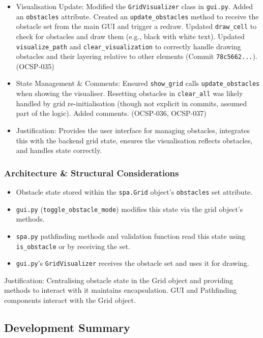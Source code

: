 \begin{enumerate}
\begin{itemize}
        \item Visualisation Update: Modified the \verb|GridVisualizer| class in \verb|gui.py|. Added an \verb|obstacles| attribute. Created an \verb|update_obstacles| method to receive the obstacle set from the main GUI and trigger a redraw. Updated \verb|draw_cell| to check for obstacles and draw them (e.g., black with white text). Updated \verb|visualize_path| and \verb|clear_visualization| to correctly handle drawing obstacles and their layering relative to other elements (Commit \verb|78c5662...|). (OCSP-035)
        \item State Management & Comments: Ensured \verb|show_grid| calls \verb|update_obstacles| when showing the visualiser. Resetting obstacles in \verb|clear_all| was likely handled by grid re-initialisation (though not explicit in commits, assumed part of the logic). Added comments. (OCSP-036, OCSP-037)
        \item Justification: Provides the user interface for managing obstacles, integrates this with the backend grid state, ensures the visualisation reflects obstacles, and handles state correctly.
    \end{itemize}
\end{enumerate}

\subsubsection{Architecture \& Structural Considerations}
\begin{itemize}
	\item Obstacle state stored within the \verb|spa.Grid| object's \verb|obstacles| set attribute.
	\item \verb|gui.py| (\verb|toggle_obstacle_mode|) modifies this state via the grid object's methods.
	\item \verb|spa.py| pathfinding methods and validation function read this state using \verb|is_obstacle| or by receiving the set.
	\item \verb|gui.py|'s \verb|GridVisualizer| receives the obstacle set and uses it for drawing.
\end{itemize}
Justification: Centralising obstacle state in the Grid object and providing methods to interact with it maintains encapsulation. GUI and Pathfinding components interact with the Grid object.

\newpage
\subsection{Development Summary}

